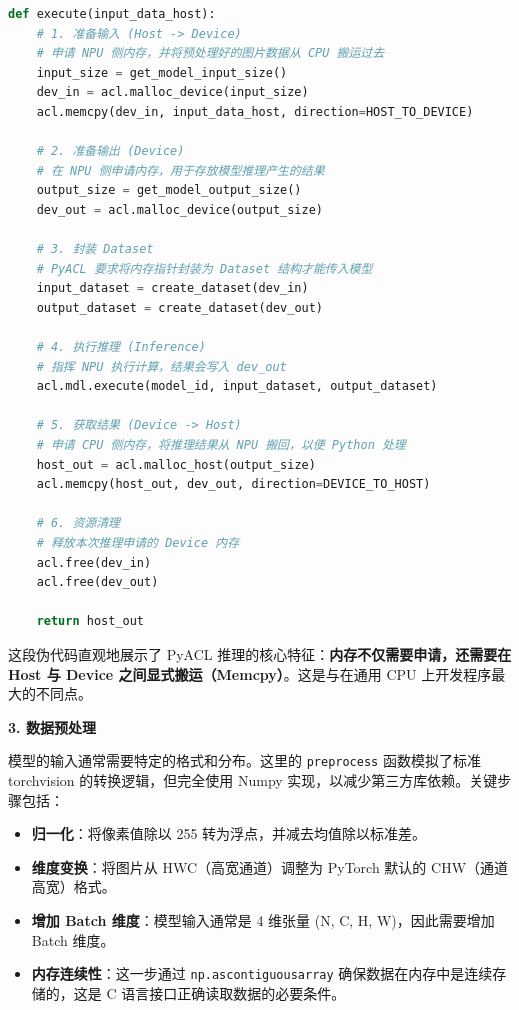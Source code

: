 \begin{lstlisting}[language=Python]
def execute(input_data_host):
    # 1. 准备输入 (Host -> Device)
    # 申请 NPU 侧内存，并将预处理好的图片数据从 CPU 搬运过去
    input_size = get_model_input_size()
    dev_in = acl.malloc_device(input_size)
    acl.memcpy(dev_in, input_data_host, direction=HOST_TO_DEVICE)
    
    # 2. 准备输出 (Device)
    # 在 NPU 侧申请内存，用于存放模型推理产生的结果
    output_size = get_model_output_size()
    dev_out = acl.malloc_device(output_size)
    
    # 3. 封装 Dataset
    # PyACL 要求将内存指针封装为 Dataset 结构才能传入模型
    input_dataset = create_dataset(dev_in)
    output_dataset = create_dataset(dev_out)

    # 4. 执行推理 (Inference)
    # 指挥 NPU 执行计算，结果会写入 dev_out
    acl.mdl.execute(model_id, input_dataset, output_dataset)

    # 5. 获取结果 (Device -> Host)
    # 申请 CPU 侧内存，将推理结果从 NPU 搬回，以便 Python 处理
    host_out = acl.malloc_host(output_size)
    acl.memcpy(host_out, dev_out, direction=DEVICE_TO_HOST)

    # 6. 资源清理
    # 释放本次推理申请的 Device 内存
    acl.free(dev_in)
    acl.free(dev_out)
    
    return host_out
\end{lstlisting}

这段伪代码直观地展示了 PyACL
推理的核心特征：\textbf{内存不仅需要申请，还需要在 Host 与 Device
之间显式搬运（Memcpy）}。这是与在通用 CPU 上开发程序最大的不同点。

\textbf{3. 数据预处理}

模型的输入通常需要特定的格式和分布。这里的
\passthrough{\lstinline!preprocess!} 函数模拟了标准 torchvision
的转换逻辑，但完全使用 Numpy 实现，以减少第三方库依赖。关键步骤包括：

\begin{itemize}
\tightlist
\item
  \textbf{归一化}：将像素值除以 255 转为浮点，并减去均值除以标准差。
\item
  \textbf{维度变换}：将图片从 HWC（高宽通道）调整为 PyTorch 默认的
  CHW（通道高宽）格式。
\item
  \textbf{增加 Batch 维度}：模型输入通常是 4 维张量 (N, C, H,
  W)，因此需要增加 Batch 维度。
\item
  \textbf{内存连续性}：这一步通过
  \passthrough{\lstinline!np.ascontiguousarray!}
  确保数据在内存中是连续存储的，这是 C 语言接口正确读取数据的必要条件。
\end{itemize}

